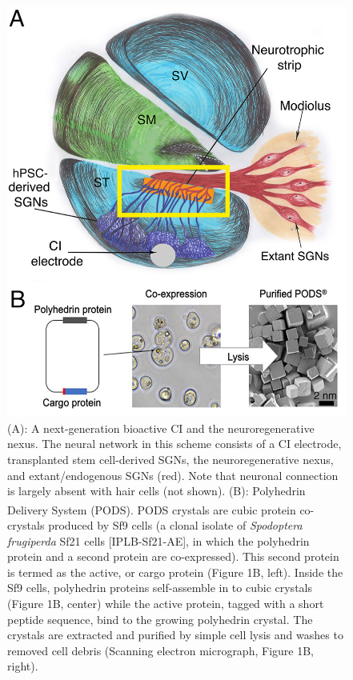\documentclass[review]{elsarticle}
\begin{document}
\begin{figure}
	\begin{center}
		\includegraphics[width=\textwidth]{Fig_1.jpg}
	\end{center}
	\caption{
		(A): A next-generation bioactive CI and the neuroregenerative nexus. The neural network in this scheme consists of a CI electrode, transplanted stem cell-derived SGNs, the neuroregenerative nexus, and extant/endogenous SGNs (red). Note that neuronal connection is largely absent with hair cells (not shown). (B): Polyhedrin Delivery System (PODS)\textsuperscript{\textregistered}. PODS\textsuperscript{\textregistered} crystals are cubic protein co-crystals produced by Sf9 cells (a clonal isolate of \textit{Spodoptera frugiperda} Sf21 cells [IPLB-Sf21-AE], in which the polyhedrin protein and a second protein are co-expressed). This second protein is termed as the active, or cargo protein (Figure 1B, left). Inside the Sf9 cells, polyhedrin proteins self-assemble in to cubic crystals (Figure 1B, center) while the active protein, tagged with a short peptide sequence, bind to the growing polyhedrin crystal. The crystals are extracted and purified by simple cell lysis and washes to removed cell debris (Scanning electron micrograph, Figure 1B, right).
	}
\end{figure}
\end{document}
